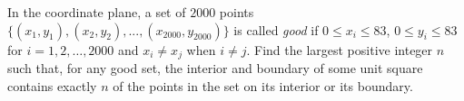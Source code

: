 In the coordinate plane, a set of $2000$ points $\{(x_1, y_1), (x_2, y_2), . . . , (x_{2000}, y_{2000})\}$ is called \textit{good} if $0\leq x_i \leq 83$, $0\leq y_i \leq 83$ for $i = 1, 2, \dots, 2000$ and $x_i \not= x_j$ when $i\not=j$. Find the largest positive integer $n$ such that, for any good set, the interior and boundary of some unit square contains exactly $n$ of the points in the set on its interior or its boundary.